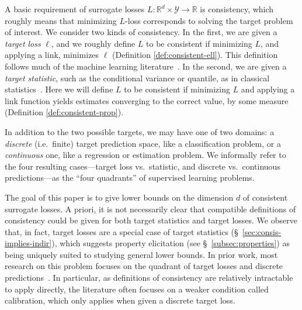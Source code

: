 \documentclass{article}
\newcommand{\Comments}{1}
\newcommand{\mynote}[2]{\ifnum\Comments=1\textcolor{#1}{#2}\fi}
\newcommand{\mytodo}[2]{\ifnum\Comments=1%
	\todo[linecolor=#1!80!black,backgroundcolor=#1,bordercolor=#1!80!black]{#2}\fi}
\newcommand{\raft}[1]{\mytodo{green!20!white}{RF: #1}}
\newcommand{\jessie}[1]{\mynote{purple}{[JF: #1]}}
\newcommand{\bo}[1]{\mynote{blue}{[Bo: #1]}}
\newcommand{\reals}{\mathbb{R}}
\newcommand{\Y}{\mathcal{Y}}
\begin{document}
A basic requirement of surrogate losses $L: \reals^d \times \Y \to \reals$ is consistency, which roughly means that minimizing $L$-loss corresponds to solving the target problem of interest.
We consider two kinds of consistency.
In the first, we are given a \emph{target loss} $\ell$, and we roughly define $L$ to be consistent if minimizing $L$, and applying a link, minimizes $\ell$ (Definition \ref{def:consistent-ell}).
This definition follows much of the machine learning literature~\citep{zhang2004statistical,bartlett2006convexity,tewari2007consistency,steinwart2007compare,ramaswamy2016convex}.
In the second, we are given a \emph{target statistic}, such as the conditional variance or quantile, as in classical statistics~\citep{fisher1922mathematical}.
Here we will define $L$ to be consistent if minimizing $L$ and applying a link function yields estimates converging to the correct value, by some measure (Definition \ref{def:consistent-prop}).

In addition to the two possible targets, we may have one of two domains: a \emph{discrete} (i.e.\ finite) target prediction space, like a classification problem, or a \emph{continuous} one, like a regression or estimation problem.
We informally refer to the four resulting cases---target loss vs.\ statistic, and discrete vs.\ continuous predictions---as the ``four quadrants'' of supervised learning problems.

The goal of this paper is to give lower bounds on the dimension $d$ of consistent surrogate losses.
A priori, it is not necessarily clear that compatible definitions of consistency could be given for both target statistics and target losses.
We observe that, in fact, target losses are a special case of target statistics (\S~\ref{sec:consis-implies-indir}),
which suggests property elicitation (see \S~\ref{subsec:properties}) as being uniquely suited to studying general lower bounds.
In prior work, most research on this problem focuses on the quadrant of target losses and discrete predictions~\citep{zhang2004statistical,bartlett2006convexity,tewari2007consistency,ramaswamy2015hierarchical,ramaswamy2016convex,ramaswamy2018consistent}.
In particular, as definitions of consistency are relatively intractable to apply directly, the literature often focuses on a weaker condition called calibration, which only applies when given a discrete target loss.
\end{document}
